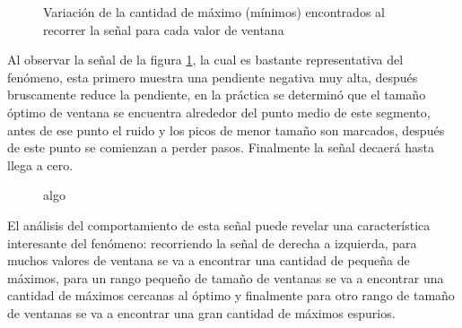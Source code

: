 \begin{figure}
    \centering
    
    \caption{Variación de la cantidad de máximo (mínimos) encontrados al recorrer la señal para cada valor de ventana}
    \label{fig:ventana}
\end{figure}

Al observar la señal de la figura \ref{fig:ventana}, la cual es bastante representativa del fenómeno, esta primero muestra una pendiente negativa muy alta, después bruscamente reduce la pendiente, en la práctica se determinó que el tamaño óptimo de ventana se encuentra alrededor del punto medio de este segmento, antes de ese punto el ruido y los picos de menor tamaño son marcados, después de este punto se comienzan a perder pasos. Finalmente la señal decaerá hasta llega a cero.

\begin{figure}
    \centering
    
    \caption{algo}
    \label{fig:histograma}
\end{figure}

El análisis del comportamiento de esta señal puede revelar una característica interesante del fenómeno: recorriendo la señal de derecha a izquierda, para muchos valores de ventana se va a encontrar una cantidad de pequeña de máximos, para un rango pequeño de tamaño de ventanas se va a encontrar una cantidad de máximos cercanas al óptimo y finalmente para otro rango de tamaño de ventanas se va a encontrar una gran cantidad de máximos espurios. 
